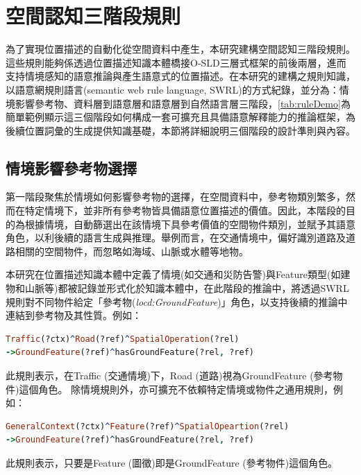 \section{空間認知三階段規則}

為了實現位置描述的自動化從空間資料中產生，本研究建構空間認知三階段規則。這些規則能夠係透過位置描述知識本體橋接O-SLD三層式框架的前後兩層，進而支持情境感知的語意推論與產生語意式的位置描述。在本研究的建構之規則知識，以語意網規則語言(semantic web rule language, SWRL)的方式紀錄，並分為：情境影響參考物、資料層到語意層和語意層到自然語言層三階段，\ref{tab:ruleDemo}為簡單範例顯示這三個階段如何構成一套可擴充且具備語意解釋能力的推論框架，為後續位置詞彙的生成提供知識基礎，本節將詳細說明三個階段的設計準則與內容。



\subsection{情境影響參考物選擇}

第一階段聚焦於情境如何影響參考物的選擇，在空間資料中，參考物類別繁多，然而在特定情境下，並非所有參考物皆具備語意位置描述的價值。因此，本階段的目的為根據情境，自動篩選出在該情境下具參考價值的空間物件類別，並賦予其語意角色，以利後續的語言生成與推理。舉例而言，在交通情境中，偏好識別道路及道路相關的空間物件，而忽略如海域、山脈或水體等地物。

本研究在位置描述知識本體中定義了情境(如交通和災防告警)與Feature類型(如建物和山脈等)都被記錄並形式化於知識本體中，在此階段的推論中，將透過SWRL規則對不同物件給定「參考物(\textit{locd:GroundFeature})」角色，以支持後續的推論中連結到參考物及其性質。例如：

\begin{lstlisting}[language=Prolog, basicstyle=\ttfamily, xleftmargin=2em]
Traffic(?ctx)^Road(?ref)^SpatialOperation(?rel) 
->GroundFeature(?ref)^hasGroundFeature(?rel, ?ref)
\end{lstlisting}

此規則表示，在Traffic (交通情境)下，Road (道路)視為GroundFeature (參考物件)這個角色。
除情境規則外，亦可擴充不依賴特定情境或物件之通用規則，例如：

\begin{lstlisting}[language=Prolog, basicstyle=\ttfamily, xleftmargin=2em]
GeneralContext(?ctx)^Feature(?ref)^SpatialOpeartion(?rel)
->GroundFeature(?ref)^hasGroundFeature(?rel, ?ref)
\end{lstlisting}

此規則表示，只要是Feature (圖徵)即是GroundFeature (參考物件)這個角色。


